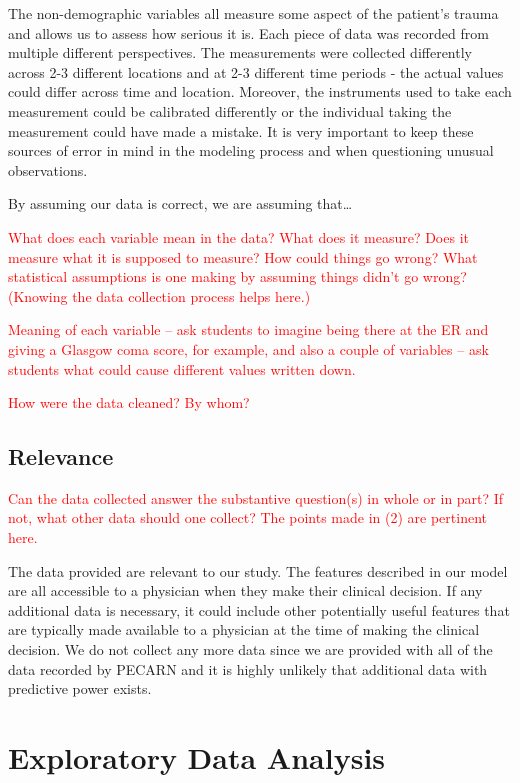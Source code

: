 \documentclass[
]{article}
\begin{document}
The non-demographic variables all measure some aspect of the patient's
trauma and allows us to assess how serious it is. Each piece of data was
recorded from multiple different perspectives. The measurements were
collected differently across 2-3 different locations and at 2-3
different time periods - the actual values could differ across time and
location. Moreover, the instruments used to take each measurement could
be calibrated differently or the individual taking the measurement could
have made a mistake. It is very important to keep these sources of error
in mind in the modeling process and when questioning unusual
observations.

By assuming our data is correct, we are assuming that\ldots{}

\textcolor{red}{What does each variable mean in the data? What does it measure? Does it measure what it is supposed to measure? How could things go wrong? What statistical assumptions is one making by assuming things didn’t go wrong? (Knowing the data collection process helps here.)}

\textcolor{red}{Meaning of each variable -- ask students to imagine being there at the ER and giving a Glasgow coma score, for example, and also a couple of variables -- ask students what could cause different values written down.}

\textcolor{red}{How were the data cleaned? By whom?}

\hypertarget{relevance}{%
\subsection{Relevance}\label{relevance}}

\textcolor{red}{Can the data collected answer the substantive question(s) in whole or in part? If not, what other data should one collect? The points made in (2) are pertinent here.}

The data provided are relevant to our study. The features described in
our model are all accessible to a physician when they make their
clinical decision. If any additional data is necessary, it could include
other potentially useful features that are typically made available to a
physician at the time of making the clinical decision. We do not collect
any more data since we are provided with all of the data recorded by
PECARN and it is highly unlikely that additional data with predictive
power exists.

\hypertarget{sec:eda}{%
\section{Exploratory Data Analysis}\label{sec:eda}}
\end{document}
